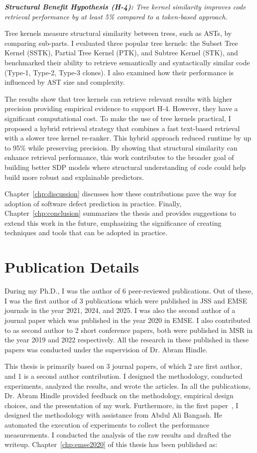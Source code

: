 \documentclass[\main/thesis.tex]{subfiles}
\begin{document}
\textit{\textbf{Structural Benefit Hypothesis (H-4):} Tree kernel similarity improves code retrieval performance by at least 5\% compared to a token-based approach.}

Tree kernels measure structural similarity between trees, such as ASTs, by comparing sub-parts. I evaluated three popular tree kernels: the Subset Tree Kernel (SSTK), Partial Tree Kernel (PTK), and Subtree Kernel (STK), and benchmarked their ability to retrieve semantically and syntactically similar code (Type-1, Type-2, Type-3 clones). I also examined how their performance is influenced by AST size and complexity.

The results show that tree kernels can retrieve relevant results with higher precision providing empirical evidence to support H-4. However, they have a significant computational cost. To  make the use of tree kernels practical, I proposed a hybrid retrieval strategy that combines a fast text-based retrieval with a slower tree kernel re-ranker. This hybrid approach reduced runtime by up to 95\% while preserving precision. By showing that structural similarity can enhance retrieval performance, this work contributes to the broader goal of building better SDP models where structural understanding of code could help build more robust and explainable predictors.


Chapter~\ref{chp:discussion} discusses how these contributions pave the way for adoption of software defect prediction in practice. Finally, Chapter~\ref{chp:conclusion} summarizes the thesis and provides suggestions to extend this work in the future, emphasizing the significance of creating techniques and tools that can be adopted in practice.


\section{Publication Details}
During my Ph.D., I was the author of 6 peer-reviewed publications. Out of these, I was the first author of 3 publications which were published in JSS and EMSE journals in the year 2021, 2024, and 2025. I was also  the second author of a journal paper which was published in the year 2020 in EMSE. I also contributed to as second author to 2 short conference papers, both were published in MSR in the year 2019 and 2022 respectively. All the research in these published in these papers was conducted under the supervision of Dr. Abram Hindle.

This thesis is primarily based on 3 journal papers, of which 2 are first author, and 1 is a second author contribution. I designed the methodology, conducted experiments, analyzed the results, and wrote the articles. In all the publications, Dr. Abram Hindle provided feedback on the methodology, empirical design choices, and the presentation of my work. Furthermore, in the first paper~\cite{bangash2020time}, I designed the methodology with assistance from Abdul Ali Bangash. He automated the execution of experiments to collect the performance measurements. I conducted the analysis of the raw results and drafted the writeup. Chapter~\ref{chp:emse2020} of this thesis has been published as:
\end{document}
